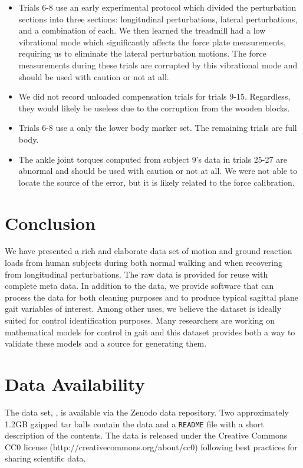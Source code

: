 \documentclass[fleqn,12pt]{wlpeerj}
\begin{document}
\begin{itemize}
    concrete floor to eliminate the treadmill's low vibration mode
    (approximately 5\si{\hertz}). But these blocks seem to have corrupted the
    force plate measurements by imposing frictional stresses on the system. The
    force plate measurements should not be used from these trials, but the
    marker data is fine.
  \item Trials 6-8 use an early experimental protocol which divided the
    perturbation sections into three sections: longitudinal perturbations,
    lateral perturbations, and a combination of each. We then learned the
    treadmill had a low vibrational mode which significantly affects the force
    plate measurements, requiring us to eliminate the lateral perturbation
    motions. The force measurements during these trials are corrupted by this
    vibrational mode and should be used with caution or not at all.
  \item We did not record unloaded compensation trials for trials 9-15.
    Regardless, they would likely be useless due to the corruption from the
    wooden blocks.
  \item Trials 6-8 use a only the lower body marker set. The remaining trials
    are full body.
  \item The ankle joint torques computed from subject 9's data in trials 25-27
    are abnormal and should be used with caution or not at all. We were not
    able to locate the source of the error, but it is likely related to the
    force calibration.
\end{itemize}

\section*{Conclusion}
%
We have presented a rich and elaborate data set of motion and ground reaction
loads from human subjects during both normal walking and when recovering from
longitudinal perturbations. The raw data is provided for reuse with complete
meta data. In addition to the data, we provide software that can process the
data for both cleaning purposes and to produce typical sagittal plane gait
variables of interest. Among other uses, we believe the dataset is ideally
suited for control identification purposes. Many researchers are working on
mathematical models for control in gait and this dataset provides both a way to
validate these models and a source for generating them.

\section*{Data Availability}
The data set, \cite{Moore2014}, is available via the Zenodo data repository.
Two approximately 1.2GB gzipped tar balls contain the data and a \verb|README|
file with a short description of the contents. The data is released under the
Creative Commons CC0 license (http://creativecommons.org/about/cc0) following
best practices for sharing scientific data.
\end{document}
